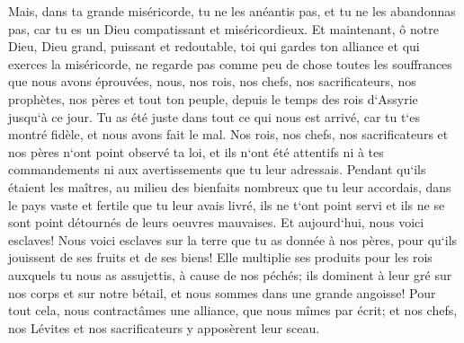 \verse Mais, dans ta grande miséricorde, tu ne les anéantis pas, et tu ne les abandonnas pas, car tu es un Dieu compatissant et miséricordieux. 
\verse Et maintenant, ô notre Dieu, Dieu grand, puissant et redoutable, toi qui gardes ton alliance et qui exerces la miséricorde, ne regarde pas comme peu de chose toutes les souffrances que nous avons éprouvées, nous, nos rois, nos chefs, nos sacrificateurs, nos prophètes, nos pères et tout ton peuple, depuis le temps des rois d`Assyrie jusqu`à ce jour. 
\verse Tu as été juste dans tout ce qui nous est arrivé, car tu t`es montré fidèle, et nous avons fait le mal. 
\verse Nos rois, nos chefs, nos sacrificateurs et nos pères n`ont point observé ta loi, et ils n`ont été attentifs ni à tes commandements ni aux avertissements que tu leur adressais. 
\verse Pendant qu`ils étaient les maîtres, au milieu des bienfaits nombreux que tu leur accordais, dans le pays vaste et fertile que tu leur avais livré, ils ne t`ont point servi et ils ne se sont point détournés de leurs oeuvres mauvaises. 
\verse Et aujourd`hui, nous voici esclaves! Nous voici esclaves sur la terre que tu as donnée à nos pères, pour qu`ils jouissent de ses fruits et de ses biens! 
\verse Elle multiplie ses produits pour les rois auxquels tu nous as assujettis, à cause de nos péchés; ils dominent à leur gré sur nos corps et sur notre bétail, et nous sommes dans une grande angoisse! 
\verse Pour tout cela, nous contractâmes une alliance, que nous mîmes par écrit; et nos chefs, nos Lévites et nos sacrificateurs y apposèrent leur sceau. 

